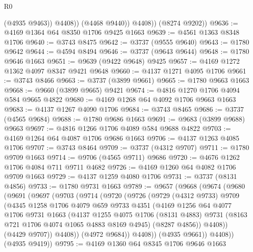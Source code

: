 \begin{lexlean}{R0}
\begin{coremodule}
                  (@4935 @9463))
                @4408))
            (@4468 @9440))
          @4408))
      (@8274 @9202))
@9636 := @4169 @1364 @64 @8350 @1706 @9425 @1663
@9639 := @4561 @1363 @8348 @1706
@9640 := @3743 @8475
@9642 := @3737 (@9555 @9640)
@9643 := @1780 @9642
@9644 := @4594 @8494
@9646 := @3737 (@9643 @9644)
@9648 := @1780 @9646 @1663
@9651 := @9639 (@9422 @9648) @9425
@9657 := @4169 @1272 @1362 @4097 @8347 @9421 @9648
@9660 := @4137 @1271 @4095 @1706
@9661 := @3743 @8466
@9663 := @3737 (@3899 @9661)
@9665 := @1780 @9663 @1663
@9668 := @9660 (@3899 @9665) @9421
@9674 := @4816 @1270 @1706 @4094 @584 @9665 @4822
@9680 := @4169 @1268 @64 @4092 @1706 @9663 @1663
@9683 := @4137 @1267 @4090 @1706
@9684 := @3743 @8465
@9686 := @3737 (@4565 @9684)
@9688 := @1780 @9686 @1663
@9691 := @9683 (@3899 @9688) @9663
@9697 := @4816 @1266 @1706 @4089 @584 @9688 @4822
@9703 := @4169 @1264 @64 @4087 @1706 @9686 @1663
@9706 := @4137 @1263 @4085 @1706
@9707 := @3743 @8464
@9709 := @3737 (@4312 @9707)
@9711 := @1780 @9709 @1663
@9714 := @9706 (@4565 @9711) @9686
@9720 := @4676 @1262 @1706 @4084 @711 @9711 @4682
@9726 := @4169 @1260 @64 @4082 @1706 @9709 @1663
@9729 := @4137 @1259 @4080 @1706
@9731 := @3737 (@8131 @4856)
@9733 := @1780 @9731 @1663
@9789 := @9657
    (@9668
      (@9674
        (@9680
          (@9691
            (@9697
              (@9703
                (@9714
                  (@9720
                    (@9726
                      (@9729
                        (@4312 @9733)
                        @9709
                        (@4345
                          @1258
                          @1706
                          @4079
                          @659
                          @9733
                          @4351
                          (@4169
                            @1256
                            @64
                            @4077
                            @1706
                            @9731
                            @1663
                            (@4137
                              @1255
                              @4075
                              @1706
                              (@8131 @4883)
                              @9731
                              (@8163 @721 @1706 @4074 @1065 @4883 @8169 @4945)
                              (@8287 @4856))
                            @4408))
                        (@4429 @9707))
                      @4408))
                  (@4972 @9684))
                @4408))
            (@4935 @9661))
          @4408))
      (@4935 @9419))
@9795 := @4169 @1360 @64 @8345 @1706 @9646 @1663

\end{coremodule}
\end{lexlean}
